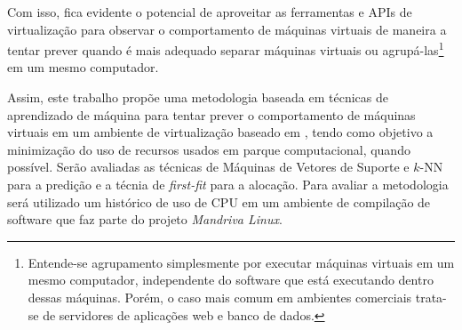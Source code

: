 Com isso, fica evidente o potencial de aproveitar as ferramentas e APIs de
virtualização para observar o comportamento de máquinas virtuais de maneira
a tentar prever quando é mais adequado separar máquinas virtuais ou
agrupá-las\footnote{Entende-se agrupamento simplesmente por
executar máquinas virtuais em um mesmo computador, independente do software
que está executando dentro dessas máquinas. Porém, o caso mais comum em
ambientes comerciais trata-se de servidores de aplicações web e banco de
dados.} em um mesmo computador. 

Assim, este trabalho propõe uma metodologia baseada em técnicas de
aprendizado de máquina para tentar prever o comportamento de máquinas
virtuais em um ambiente de virtualização baseado em \libvirt{}, tendo como
objetivo a minimização do uso de recursos usados em parque computacional,
quando possível. Serão avaliadas as técnicas de Máquinas de Vetores de
Suporte e $k$-NN para a predição e a técnia de \emph{first-fit} para a
alocação. Para avaliar a metodologia será utilizado um histórico de uso de
CPU em um ambiente de compilação de software que faz parte do projeto
\emph{Mandriva Linux}.
